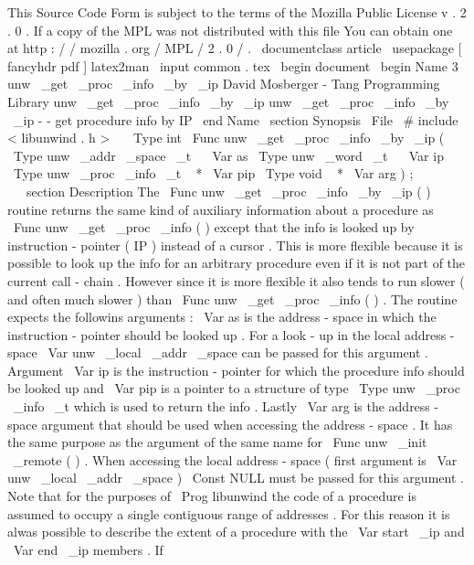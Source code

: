 %
This
Source
Code
Form
is
subject
to
the
terms
of
the
Mozilla
Public
%
License
v
.
2
.
0
.
If
a
copy
of
the
MPL
was
not
distributed
with
this
%
file
You
can
obtain
one
at
http
:
/
/
mozilla
.
org
/
MPL
/
2
.
0
/
.
\
documentclass
{
article
}
\
usepackage
[
fancyhdr
pdf
]
{
latex2man
}
\
input
{
common
.
tex
}
\
begin
{
document
}
\
begin
{
Name
}
{
3
}
{
unw
\
_get
\
_proc
\
_info
\
_by
\
_ip
}
{
David
Mosberger
-
Tang
}
{
Programming
Library
}
{
unw
\
_get
\
_proc
\
_info
\
_by
\
_ip
}
unw
\
_get
\
_proc
\
_info
\
_by
\
_ip
-
-
get
procedure
info
by
IP
\
end
{
Name
}
\
section
{
Synopsis
}
\
File
{
\
#
include
<
libunwind
.
h
>
}
\
\
\
Type
{
int
}
\
Func
{
unw
\
_get
\
_proc
\
_info
\
_by
\
_ip
}
(
\
Type
{
unw
\
_addr
\
_space
\
_t
~
}
\
Var
{
as
}
\
Type
{
unw
\
_word
\
_t
~
}
\
Var
{
ip
}
\
Type
{
unw
\
_proc
\
_info
\
_t
~
*
}
\
Var
{
pip
}
\
Type
{
void
~
*
}
\
Var
{
arg
}
)
;
\
\
\
section
{
Description
}
The
\
Func
{
unw
\
_get
\
_proc
\
_info
\
_by
\
_ip
}
(
)
routine
returns
the
same
kind
of
auxiliary
information
about
a
procedure
as
\
Func
{
unw
\
_get
\
_proc
\
_info
}
(
)
except
that
the
info
is
looked
up
by
instruction
-
pointer
(
IP
)
instead
of
a
cursor
.
This
is
more
flexible
because
it
is
possible
to
look
up
the
info
for
an
arbitrary
procedure
even
if
it
is
not
part
of
the
current
call
-
chain
.
However
since
it
is
more
flexible
it
also
tends
to
run
slower
(
and
often
much
slower
)
than
\
Func
{
unw
\
_get
\
_proc
\
_info
}
(
)
.
The
routine
expects
the
followins
arguments
:
\
Var
{
as
}
is
the
address
-
space
in
which
the
instruction
-
pointer
should
be
looked
up
.
For
a
look
-
up
in
the
local
address
-
space
\
Var
{
unw
\
_local
\
_addr
\
_space
}
can
be
passed
for
this
argument
.
Argument
\
Var
{
ip
}
is
the
instruction
-
pointer
for
which
the
procedure
info
should
be
looked
up
and
\
Var
{
pip
}
is
a
pointer
to
a
structure
of
type
\
Type
{
unw
\
_proc
\
_info
\
_t
}
which
is
used
to
return
the
info
.
Lastly
\
Var
{
arg
}
is
the
address
-
space
argument
that
should
be
used
when
accessing
the
address
-
space
.
It
has
the
same
purpose
as
the
argument
of
the
same
name
for
\
Func
{
unw
\
_init
\
_remote
}
(
)
.
When
accessing
the
local
address
-
space
(
first
argument
is
\
Var
{
unw
\
_local
\
_addr
\
_space
}
)
\
Const
{
NULL
}
must
be
passed
for
this
argument
.
Note
that
for
the
purposes
of
\
Prog
{
libunwind
}
the
code
of
a
procedure
is
assumed
to
occupy
a
single
contiguous
range
of
addresses
.
For
this
reason
it
is
alwas
possible
to
describe
the
extent
of
a
procedure
with
the
\
Var
{
start
\
_ip
}
and
\
Var
{
end
\
_ip
}
members
.
If
